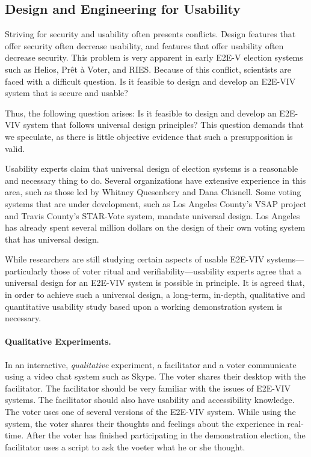 \subsection{Design and Engineering for Usability}

Striving for security and usability often presents conflicts. Design
features that offer security often decrease usability, and features
that offer usability often decrease security. This problem is very
apparent in early E2E-V election systems such as Helios, Prêt à Voter,
and RIES. Because of this conflict, scientists are faced with a
difficult question. Is it feasible to design and develop an E2E-VIV
system that is secure and usable?

Thus, the following question arises: Is it feasible to design and
develop an E2E-VIV system that follows universal design principles?
This question demands that we speculate, as there is little objective
evidence that such a presupposition is valid.

Usability experts claim that universal design of election systems is a
reasonable and necessary thing to do. Several organizations have
extensive experience in this area, such as those led by Whitney
Quesenbery and Dana Chisnell. Some voting systems that are under
development, such as Los Angeles County's VSAP project and Travis
County's STAR-Vote system, mandate universal design. Los Angeles has
already spent several million dollars on the design of their own
voting system that has universal design.

While researchers are still studying certain aspects of usable E2E-VIV
systems---particularly those of voter ritual and
verifiability---usability experts agree that a universal design for an
E2E-VIV system is possible in principle. It is agreed that, in order
to achieve such a universal design, a long-term, in-depth, qualitative
and quantitative usability study based upon a working demonstration
system is necessary.

\paragraph{Qualitative Experiments.}
In an interactive, \emph{qualitative} experiment, a facilitator and a
voter communicate using a video chat system such as Skype. The voter
shares their desktop with the facilitator. The facilitator should be
very familiar with the issues of E2E-VIV systems. The facilitator
should also have usability and accessibility knowledge. The voter uses
one of several versions of the E2E-VIV system.  While using the
system, the voter shares their thoughts and feelings about the
experience in real-time. After the voter has finished participating in
the demonstration election, the facilitator uses a script to ask the
voeter what he or she thought.

